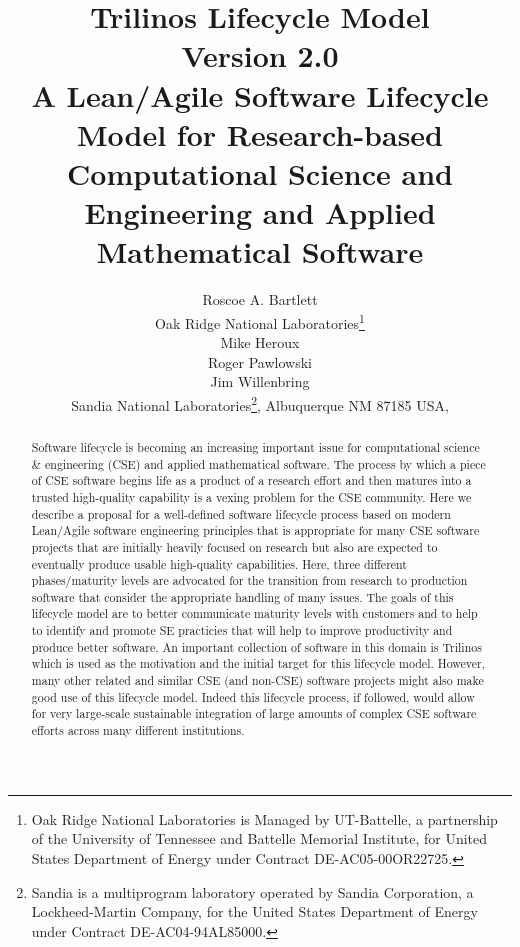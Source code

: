 \documentclass[11pt]{SANDreport}
\title{\center
Trilinos Lifecycle Model \\[2ex] Version 2.0 \\[2ex] \large A
Lean/Agile Software Lifecycle Model for Research-based Computational
Science and Engineering and Applied Mathematical Software }
\author{
Roscoe A. Bartlett \\ Oak Ridge National Laboratories\footnote{Oak
Ridge National Laboratories is Managed by UT-Battelle, a partnership
of the University of Tennessee and Battelle Memorial Institute, for
United States Department of Energy under Contract DE-AC05-00OR22725.} 
\\[2ex] Mike Heroux \\ Roger Pawlowski \\ Jim Willenbring \\ Sandia
National Laboratories\footnote{Sandia is a multiprogram laboratory
operated by Sandia Corporation, a Lockheed-Martin Company, for the
United States Department of Energy under Contract DE-AC04-94AL85000.},
Albuquerque NM 87185 USA, \\ }
\date{}
\begin{document}

\maketitle

%

%
\begin{abstract}
%

Software lifecycle is becoming an increasing important issue for
computational science \& engineering (CSE) and applied mathematical
software.  The process by which a piece of CSE software begins life as
a product of a research effort and then matures into a trusted
high-quality capability is a vexing problem for the CSE community.
Here we describe a proposal for a well-defined software lifecycle
process based on modern Lean/Agile software engineering principles
that is appropriate for many CSE software projects that are initially
heavily focused on research but also are expected to eventually
produce usable high-quality capabilities.  Here, three different
phases/maturity levels are advocated for the transition from research
to production software that consider the appropriate handling of many
issues.  The goals of this lifecycle model are to better communicate
maturity levels with customers and to help to identify and promote SE
practicies that will help to improve productivity and produce better
software.  An important collection of software in this domain is
Trilinos which is used as the motivation and the initial target for
this lifecycle model.  However, many other related and similar CSE
(and non-CSE) software projects might also make good use of this
lifecycle model.  Indeed this lifecycle process, if followed, would
allow for very large-scale sustainable integration of large amounts of
complex CSE software efforts across many different institutions.

%
\end{abstract}
%

%
%
%
\end{document}
